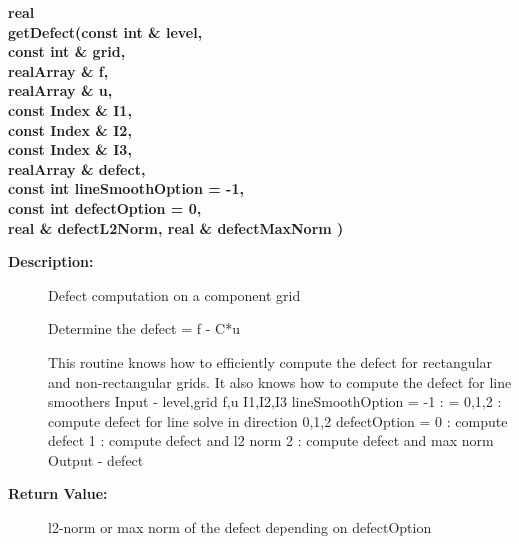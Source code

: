 \begin{flushleft} \textbf{%
real  \\ 
\settowidth{\OgmgIncludeArgIndent}{getDefect(}%
getDefect(const int \& level, \\ 
\hspace{\OgmgIncludeArgIndent}const int \& grid, \\ 
\hspace{\OgmgIncludeArgIndent}realArray \& f,     \\ 
\hspace{\OgmgIncludeArgIndent}realArray \& u, \\ 
\hspace{\OgmgIncludeArgIndent}const Index \& I1,\\ 
\hspace{\OgmgIncludeArgIndent}const Index \& I2,\\ 
\hspace{\OgmgIncludeArgIndent}const Index \& I3,\\ 
\hspace{\OgmgIncludeArgIndent}realArray \& defect,\\ 
\hspace{\OgmgIncludeArgIndent}const int lineSmoothOption  = -1,\\ 
\hspace{\OgmgIncludeArgIndent}const int defectOption  = 0,\\ 
\hspace{\OgmgIncludeArgIndent}real \& defectL2Norm, real \& defectMaxNorm )
}\end{flushleft}
\begin{description}
\item[{\bf Description:}] 
    Defect computation on a component grid

   Determine the defect = f - C*u

   This routine knows how to efficiently compute the defect for rectangular
   and non-rectangular grids. It also knows how to compute the defect for
   line smoothers
 Input -
   level,grid
   f,u
   I1,I2,I3
   lineSmoothOption = -1 :
                    = 0,1,2 : compute defect for line solve in direction 0,1,2
   defectOption = 0 : compute defect
                  1  : compute defect and l2 norm
                  2  : compute defect and max norm
 Output -
   defect

\item[{\bf Return Value:}]  l2-norm or max norm of the defect depending on defectOption

\end{description}
